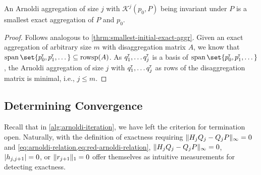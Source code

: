 \documentclass[runningheads]{llncs}
\newcommand*{\transp}{^{\mkern-1.5mu{\scriptscriptstyle\mathsf{T}}}}
\DeclareMathOperator{\rowsp}{rowsp}
\DeclareMathOperator{\spn}{span}
\DeclarePairedDelimiter{\abs}{\lvert}{\rvert}
\DeclarePairedDelimiter{\norm}{\lVert}{\rVert}
\begin{document}
\begin{theorem}\label{thrm:smallest-exact-aggr}
    An Arnoldi aggregation of size $j$ with $\mathcal{K}^j(p_0, P)$ being invariant under $P$ is a smallest exact aggregation of $P$ and $p_0$.
\end{theorem}
\begin{proof}
    Follows analogous to \cref{thrm:smallest-initial-exact-aggr}.
    Given an exact aggregation of arbitrary size $m$ with disaggregation matrix $A$, we know that $\spn \set{p_0\transp, p_1\transp, \dots} \subseteq \rowsp(A)$.
    As $q_1\transp, \dots q_j\transp$ is a basis of $\spn \set{p_0\transp, p_1\transp, \dots}$, the Arnoldi aggregation of size $j$ with $q_1\transp, \dots q_j\transp$ as rows of the disaggregation matrix is minimal, i.e., $j \leq m$.
\end{proof}

\subsection{Determining Convergence}\label{subsec:convergence}
Recall that in \cref{alg:arnoldi-iteration}, we have left the criterion for termination open.
Naturally, with the definition of exactness requiring $\norm{H_j Q_j - Q_j P}_\infty = 0$ and \cref{eq:arnoldi-relation,eq:red-arnoldi-relation}, $\norm{H_j Q_j - Q_j P}_\infty = 0$, $\abs{h_{j, j + 1}} = 0$, or $\norm{r_{j+1}}_1 = 0$ offer themselves as intuitive measurements for detecting exactness.
\end{document}
